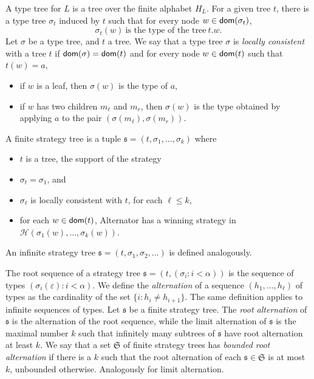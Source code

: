 A type tree for $L$ is a tree over the finite alphabet $H_L$. For a given tree $t$, there is a type tree $\sigma_t$ induced by $t$ such that for every node $w \in \mathsf{dom}(\sigma_t)$, 
\begin{equation}
\label{formula:sigmat}
\sigma_t(w)\ \mbox{is the type of the tree}\ t.w.
\end{equation}
Let $\sigma$ be a type tree, and $t$ a tree. We say that a type tree $\sigma$ is \emph{locally consistent} with a tree $t$ if $\mathsf{dom}(\sigma)=\mathsf{dom}(t)$ and for every node $w \in \mathsf{dom}(t)$ such that $t(w)=a$, 
\begin{itemize}
\item if $w$ is a leaf, then $\sigma(w)$ is the type of $a$,
\item if $w$ has two children $m_\ell$ and $m_r$, then $\sigma(w)$ is the type obtained by applying $a$ to the pair $(\sigma(m_\ell), \sigma(m_r))$.
\end{itemize}
\begin{definition} A finite strategy tree is a tuple
$\mathfrak{s}=(t, \sigma_1, \dots, \sigma_k)$ where
\begin{itemize}
\item $t$ is a tree, the support of the strategy
\item $\sigma_t=\sigma_1$, and
\item $\sigma_\ell$ is locally consistent with $t$, for each $\ell \leq k$,
\item for each $w \in \mathsf{dom}(t)$, Alternator has a winning strategy in $\mathcal{H}(\sigma_1(w), \dots, \sigma_k(w))$.
\end{itemize}
An  infinite strategy tree $\mathfrak{s}=(t, \sigma_1, \sigma_2, \dots )$ is defined analogously.
\end{definition}
The root sequence of a strategy tree $\mathfrak{s}=(t, (\sigma_i : i < \alpha))$ is the sequence of types $(\sigma_i(\varepsilon): i < \alpha)$.  We define the \emph{alternation} of a sequence $(h_1,\dots,h_\ell)$ of types as the cardinality of the set $\{ i: h_i\neq h_{i+1} \}$. The same definition applies to infinite sequences of types. Let $\mathfrak{s}$ be a finite strategy tree. The \emph{root alternation} of $\mathfrak{s}$ is the alternation of the root sequence, while the limit alternation of $\mathfrak{s}$ is the maximal number $k$ such that infinitely many subtrees of $\mathfrak{s}$ have root alternation at least $k$. We say that a set  $\mathfrak{S}$ of finite strategy trees has \emph{bounded root alternation} if there is a  $k$ such that the root alternation of each $\mathfrak{s} \in \mathfrak{S}$ is at most $k$, unbounded otherwise. Analogously for limit alternation.

